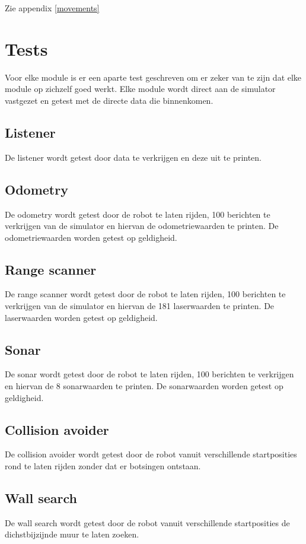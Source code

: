 \documentclass[a4paper,10pt]{article}
\begin{document}
Zie appendix \ref{movements}

\section{Tests}
Voor elke module is er een aparte test geschreven om er zeker van te zijn dat elke module op zichzelf goed werkt. Elke module wordt direct aan de simulator vastgezet en getest met de directe data die binnenkomen. 

\subsection{Listener}
De listener wordt getest door data te verkrijgen en deze uit te printen.

\subsection{Odometry}
De odometry wordt getest door de robot te laten rijden, 100 berichten te verkrijgen van de simulator en hiervan de odometriewaarden te printen. De odometriewaarden worden getest op geldigheid.

\subsection{Range scanner}
De range scanner wordt getest door de robot te laten rijden, 100 berichten te verkrijgen van de simulator en hiervan de 181 laserwaarden te printen. De laserwaarden worden getest op geldigheid.

\subsection{Sonar}
De sonar wordt getest door de robot te laten rijden, 100 berichten te verkrijgen en hiervan de 8 sonarwaarden te printen. De sonarwaarden worden getest op geldigheid.

\subsection{Collision avoider}
De collision avoider wordt getest door de robot vanuit verschillende startposities rond te laten rijden zonder dat er botsingen ontstaan.

\subsection{Wall search}
De wall search wordt getest door de robot vanuit verschillende startposities de dichstbijzijnde muur te laten zoeken. 
\end{document}

